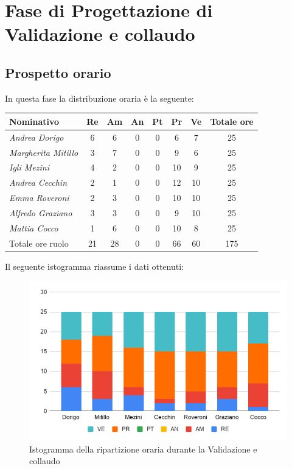 {{{{{{{{{{{{{{{{{\section{Fase di Progettazione di Validazione e collaudo}\label{PreventivoFaseDiProgettazionediValidazioneECollaudo}

\subsection{Prospetto orario}\label{PreventivoPreventivoFaseDiProgettazionediValidazioneECollaudoProspettoOrario}
In questa fase la distribuzione oraria è la seguente:
\quad
\def\tabularxcolumn#1{m{#1}}
{

	\begin{center}
		\renewcommand{\arraystretch}{1.4}
		\begin{tabularx}{\textwidth}{|X|c|c|c|c|c|c|c|}
			\hline
			\rowcolor{airforceblue}
			\textbf{Nominativo} & \textbf{Re} & \textbf{Am} & \textbf{An} & \textbf{Pt} & \textbf{Pr} & \textbf{Ve} & \textbf{Totale ore}\\
			\hline
			\textit{Andrea Dorigo} & 6 & 6 & 0 & 0 & 6 & 7 & 25\\
			\hline
			\textit{Margherita Mitillo} & 3 & 7 & 0 & 0 & 9 & 6 & 25\\
			\hline
			\textit{Igli Mezini} & 4 & 2 & 0 & 0 & 10 & 9 & 25\\
			\hline
			\textit{Andrea Cecchin} & 2 & 1 & 0 & 0 & 12 & 10 & 25\\
			\hline
			\textit{Emma Roveroni} & 2 & 3 & 0 & 0 & 10 & 10 & 25\\
			\hline
			\textit{Alfredo Graziano} & 3 & 3 & 0 & 0 & 9 & 10 & 25\\
			\hline
			\textit{Mattia Cocco} & 1 & 6 & 0 & 0 & 10 & 8 & 25\\
			\hline
			Totale ore ruolo & 21 & 28 & 0 & 0 & 66 & 60 & 175\\
			\hline
		\end{tabularx}
	\end{center}
Il seguente istogramma riassume i dati ottenuti:
\begin{figure}[!ht]
	\begin{center}
		\includegraphics[width=0.7\linewidth]{../immagini/pdp/istogramma_validazione.png}
		\caption{Istogramma della ripartizione oraria durante la Validazione e
			collaudo}
	\end{center}
\end{figure}
\clearpage
}}}}}}}}}}}}}}}}}}
